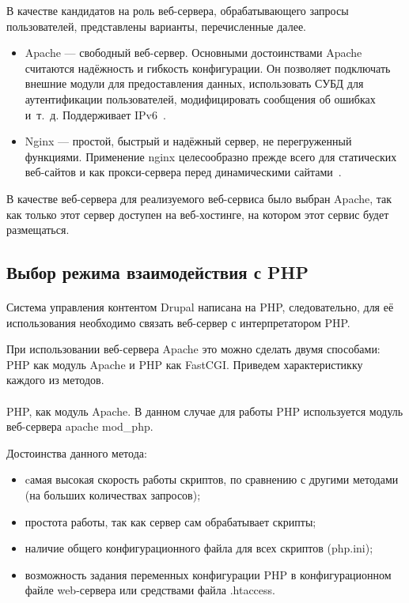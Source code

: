 В качестве кандидатов на роль веб-сервера, обрабатывающего запросы пользователей,
представлены варианты, перечисленные далее.

\begin{itemize}
  \item Apache --- свободный веб-сервер. Основными достоинствами Apache считаются надёжность и гибкость конфигурации.
    Он позволяет подключать внешние модули для предоставления данных, использовать 
    СУБД для аутентификации пользователей, модифицировать сообщения об ошибках и~т.~д. Поддерживает IPv6~\cite{wiki_apache}.

  \item Nginx --- простой, быстрый и надёжный сервер, не перегруженный функциями.
    Применение nginx целесообразно прежде всего для статических веб-сайтов
    и как прокси-сервера перед динамическими сайтами~\cite{wiki_nginx}.
\end{itemize}

В качестве веб-сервера для реализуемого веб-сервиса было выбран Apache, так как только этот сервер доступен
на веб-хостинге, на котором этот сервис будет размещаться.

\subsection{Выбор режима взаимодействия с PHP}
\label{ssec:choice_php_communication}

\paragraph{}
Система управления контентом Drupal написана на PHP, следовательно, для её использования необходимо связать
веб-сервер с интерпретатором PHP.

При использовании веб-сервера Apache это можно сделать двумя способами: PHP как модуль Apache и PHP как FastCGI.
Приведем характеристикку каждого из методов.

\paragraph{}
PHP, как модуль Apache. В данном случае для работы PHP используется модуль веб-сервера apache mod\_php.

Достоинства данного метода:
\begin{itemize}
\item
  cамая высокая скорость работы скриптов, по сравнению с другими методами (на больших количествах запросов);
\item
  простота работы, так как сервер сам обрабатывает скрипты;
\item
  наличие общего конфигурационного файла для всех скриптов (php.ini);
\item
  возможность задания переменных конфигурации PHP в конфигурационном файле web-сервера или средствами файла .htaccess.
\end{itemize}

